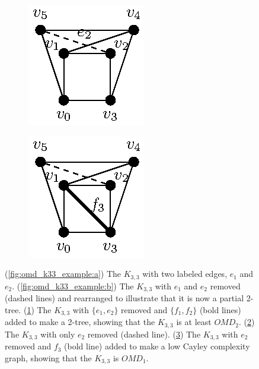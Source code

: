 \begin{figure}
\begin{subfigure}{.15\linewidth}
        \caption{}\label{fig:omd_k33_example:c}
    \end{subfigure}\hfill
    \begin{subfigure}{.15\linewidth}\centering
        \includegraphics[height=\myMinHeight]{img/epsfromtikz/omd_k33_example-1}
        \caption{}\label{fig:omd_k33_example:d}
    \end{subfigure}
    \begin{subfigure}{.15\linewidth}\centering
        \includegraphics[height=\myMinHeight]{img/epsfromtikz/omd_k33_example-2}
        \caption{}\label{fig:omd_k33_example:e}
    \end{subfigure}

    \caption{
    (\ref{fig:omd_k33_example:a}) The $K_{3,3}$ with two labeled edges, $e_1$ and $e_2$. (\ref{fig:omd_k33_example:b}) The $K_{3,3}$ with $e_1$ and $e_2$ removed (dashed lines) and rearranged to illustrate that it is now a partial 2-tree. (\ref{fig:omd_k33_example:c}) The $K_{3,3}$ with $\{e_1,e_2\}$ removed and $\{f_1,f_2\}$ (bold lines) added to make a 2-tree, showing that the $K_{3,3}$ is at least $OMD_2$. (\ref{fig:omd_k33_example:d}) The $K_{3,3}$ with only $e_2$ removed (dashed line). (\ref{fig:omd_k33_example:e}) The $K_{3,3}$ with $e_2$ removed and $f_3$ (bold line) added to make a low Cayley complexity graph, showing that the $K_{3,3}$ is $OMD_1$.
    }
    \label{fig:omd_k33_example}
\end{figure}



